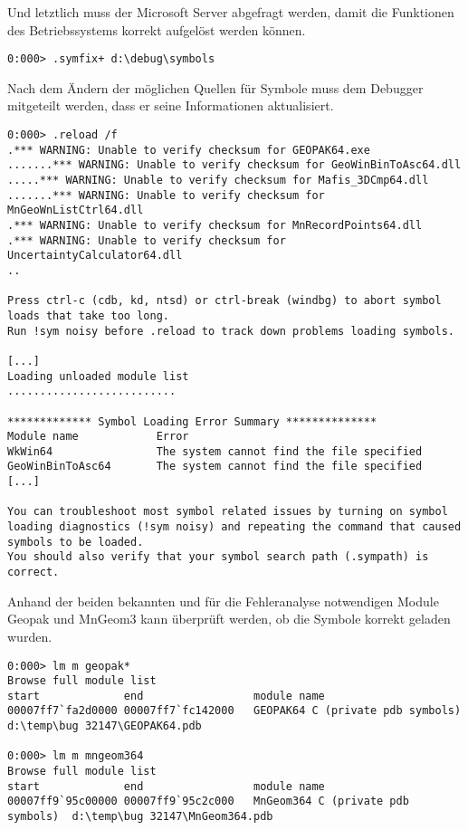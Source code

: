Und letztlich muss der Microsoft Server abgefragt werden, damit die Funktionen des Betriebssystems korrekt aufgelöst werden können.
\begin{lstlisting}[language=WinDbg]
0:000> .symfix+ d:\debug\symbols
\end{lstlisting}

Nach dem Ändern der möglichen Quellen für Symbole muss dem Debugger mitgeteilt werden, dass er seine Informationen aktualisiert.

\begin{lstlisting}
0:000> .reload /f
.*** WARNING: Unable to verify checksum for GEOPAK64.exe
.......*** WARNING: Unable to verify checksum for GeoWinBinToAsc64.dll
.....*** WARNING: Unable to verify checksum for Mafis_3DCmp64.dll
.......*** WARNING: Unable to verify checksum for MnGeoWnListCtrl64.dll
.*** WARNING: Unable to verify checksum for MnRecordPoints64.dll
.*** WARNING: Unable to verify checksum for UncertaintyCalculator64.dll
..

Press ctrl-c (cdb, kd, ntsd) or ctrl-break (windbg) to abort symbol loads that take too long.
Run !sym noisy before .reload to track down problems loading symbols.

[...]
Loading unloaded module list
..........................

************* Symbol Loading Error Summary **************
Module name            Error
WkWin64                The system cannot find the file specified
GeoWinBinToAsc64       The system cannot find the file specified
[...]

You can troubleshoot most symbol related issues by turning on symbol loading diagnostics (!sym noisy) and repeating the command that caused symbols to be loaded.
You should also verify that your symbol search path (.sympath) is correct.
\end{lstlisting}

Anhand der beiden bekannten und für die Fehleranalyse notwendigen Module Geopak und MnGeom3 kann überprüft werden, ob die Symbole korrekt geladen wurden.

\begin{lstlisting}
0:000> lm m geopak*
Browse full module list
start             end                 module name
00007ff7`fa2d0000 00007ff7`fc142000   GEOPAK64 C (private pdb symbols)  d:\temp\bug 32147\GEOPAK64.pdb

0:000> lm m mngeom364
Browse full module list
start             end                 module name
00007ff9`95c00000 00007ff9`95c2c000   MnGeom364 C (private pdb symbols)  d:\temp\bug 32147\MnGeom364.pdb
\end{lstlisting}

